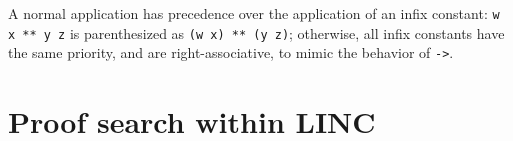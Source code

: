 A normal application has precedence over the application of an infix
constant: {\tt w x ** y z} is parenthesized as {\tt (w x) ** (y z)};
otherwise, all infix constants have the same priority, and are
right-associative, to mimic the behavior of {\tt ->}.













\section{Proof search within LINC}
\label{psearch}


